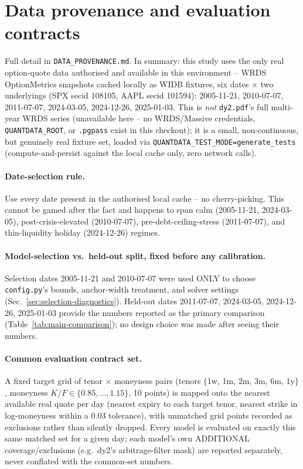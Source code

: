 \section{Data provenance and evaluation contracts}
\label{sec:data}

Full detail in \texttt{DATA\_PROVENANCE.md}. In summary: this study uses
the only real option-quote data authorised and available in this
environment -- WRDS OptionMetrics snapshots cached locally as WIDB
fixtures, six dates $\times$ two underlyings (SPX secid 108105, AAPL secid
101594): 2005-11-21, 2010-07-07, 2011-07-07, 2024-03-05, 2024-12-26,
2025-01-03. This is \emph{not} \texttt{dy2.pdf}'s full multi-year WRDS
series (unavailable here -- no WRDS/Massive credentials,
\texttt{QUANTDATA\_ROOT}, or \texttt{.pgpass} exist in this checkout); it
is a small, non-continuous, but genuinely real fixture set, loaded via
\texttt{QUANTDATA\_TEST\_MODE=generate\_tests} (compute-and-persist against
the local cache only, zero network calls).

\paragraph{Date-selection rule.} Use every date present in the authorised
local cache -- no cherry-picking. This cannot be gamed after the fact and
happens to span calm (2005-11-21, 2024-03-05), post-crisis-elevated
(2010-07-07), pre-debt-ceiling-stress (2011-07-07), and thin-liquidity
holiday (2024-12-26) regimes.

\paragraph{Model-selection vs.\ held-out split, fixed before any
calibration.} Selection dates 2005-11-21 and 2010-07-07 were used ONLY to
choose \texttt{config.py}'s bounds, anchor-width treatment, and solver
settings (Sec.~\ref{sec:selection-diagnostics}). Held-out dates 2011-07-07,
2024-03-05, 2024-12-26, 2025-01-03 provide the numbers reported as the
primary comparison (Table~\ref{tab:main-comparison}); no design choice was
made after seeing their numbers.

\paragraph{Common evaluation contract set.} A fixed target grid of tenor
$\times$ moneyness pairs (tenors $\{$1w, 1m, 2m, 3m, 6m, 1y$\}$, moneyness
$K/F\in\{0.85,\dots,1.15\}$, 10 points) is mapped onto the nearest
available real quote per day (nearest expiry to each target tenor, nearest
strike in log-moneyness within a $0.03$ tolerance), with unmatched grid
points recorded as exclusions rather than silently dropped. Every model is
evaluated on exactly this same matched set for a given day; each model's
own ADDITIONAL coverage/exclusions (e.g.\ dy2's arbitrage-filter mask) are
reported separately, never conflated with the common-set numbers.


